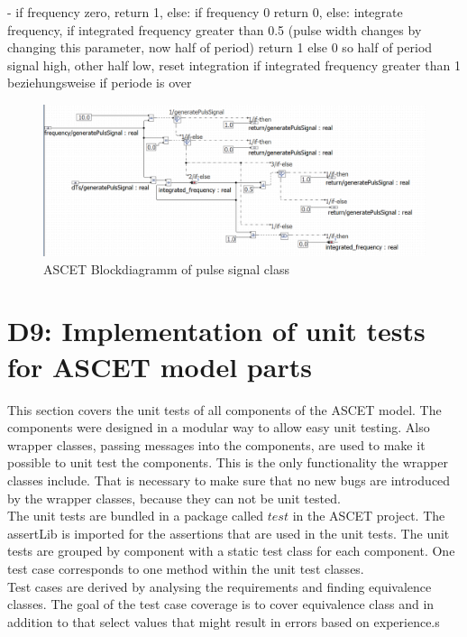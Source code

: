 - if frequency zero, return 1, else: if frequency 0 return 0, else: integrate frequency, if integrated frequency greater than 0.5 (pulse width changes by changing this parameter, now half of period) return 1 else 0 so half of period signal high, other half low, reset integration if integrated frequency greater than 1 beziehungsweise if periode is over\\

\begin{figure}[H]
\centering
\includegraphics[width=1\textwidth]{images/Blockdiagramm_PulseSignalClass.png}
\caption{ASCET Blockdiagramm of pulse signal class}
\label{fig:BlockdiagrammPulseSignal}
\end{figure}



\chapter{D9: Implementation of unit tests for ASCET model parts}\label{cha:D9}
This section covers the unit tests of all components of the ASCET model.
The components were designed in a modular way to allow easy unit testing.
Also wrapper classes, passing messages into the components, are used to make it possible to unit test the components.
This is the only functionality the wrapper classes include.
That is necessary to make sure that no new bugs are introduced by the wrapper classes, because they can not be unit tested.\\
The unit tests are bundled in a package called $test$ in the ASCET project. The assertLib is imported for the assertions that are used in the unit tests. The unit tests are grouped by component with a static test class for each component. One test case corresponds to one method within the unit test classes.\\

Test cases are derived by analysing the requirements and finding equivalence classes.
The goal of the test case coverage is to cover equivalence class and in addition to that select values that might result in errors based on experience.s

